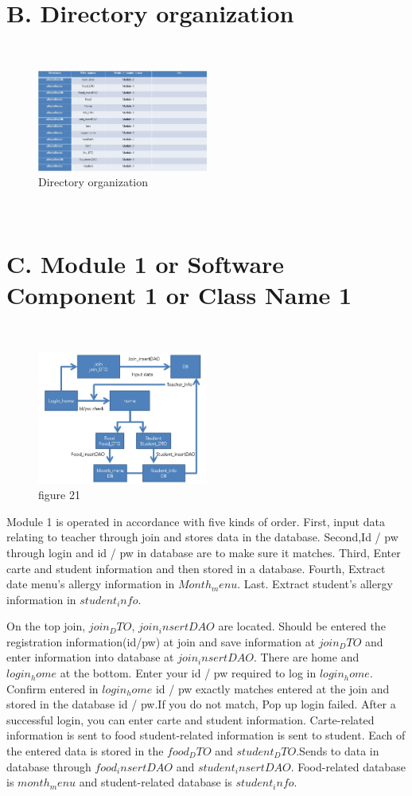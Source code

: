 \documentclass[a4paper,11pt]{IEEEtran}
\begin{document}
{{{\section*{B. Directory organization}
~\\
\begin{figure}[!h]
        \centering
        \includegraphics[width=0.5\textwidth, height=0.5\textheight]{do.jpg}
        \caption{Directory organization}
        \label{fig1}
\end{figure}
~\\
\section*{C. Module 1 or Software Component 1 or Class Name 1}
~\\
\begin{figure}[!h]
        \centering
        \includegraphics[width=0.5\textwidth, height=0.5\textheight]{m1.jpg}
        \caption{figure 21}
        \label{fig1}
\end{figure}
Module 1 is operated in accordance with five kinds of order. First, input data relating to teacher through join and stores data in the database.
Second,Id / pw through login and id / pw in database are to make sure it matches.
Third, Enter carte and student information and then stored in a database.
Fourth, Extract date menu's allergy information in $Month_menu$.
Last. Extract student's allergy information in $student_info$.

On the top join, $join_DTO$, $join_insertDAO$ are located. Should be entered the registration information(id/pw) at join and save information at $join_DTO$ and enter information into database at $join_insertDAO$. There are home and $login_home$ at the bottom. Enter your id / pw required to log in $login_home$. Confirm entered in $login_home$ id / pw exactly matches entered at the join and stored in the database id / pw.If you do not match, Pop up login failed. After a successful login, you can enter carte and student information. Carte-related information is sent to food student-related information is sent to student. Each of the entered data is stored in the $food_DTO$ and $student_DTO$.Sends to data in database through $food_insertDAO$ and $student_insertDAO$. Food-related database is $month_menu$ and student-related database is $student_info$.
~\\
}}}
\end{document}
